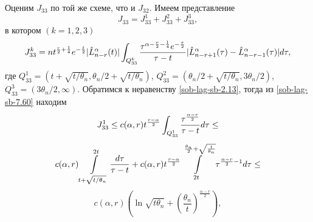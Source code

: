 Оценим $J_{33}$ по той же схеме, что и $J_{32}$. Имеем представление
\begin{equation}\label{sob-lag-sb-7.59}
J_{33}=J_{33}^1+J_{33}^2+J_{33}^3,
\end{equation}
в котором $(k=1,2,3)$
\begin{equation}\label{sob-lag-sb-7.60}
J_{33}^k=nt^{\frac{r}{2}+\frac14}e^{-\frac{t}{2}}|\hat L_{n-r}^\alpha(t)|\int_{Q_{{33}}^k}{\tau^{\alpha-\frac{r}{2}-\frac14}e^{-\frac{\tau}{2}}\over \tau-t}|\hat L_{n-r+1}^\alpha(\tau)-\hat L_{n-r-1}^\alpha(\tau)|d\tau,
\end{equation}
где $Q_{33}^1=(t+\sqrt{t/\theta_n},\theta_n/2+\sqrt{t/\theta_n})$, $Q_{33}^2=(\theta_n/2+\sqrt{t/\theta_n},3\theta_n/2)$, $Q_{33}^3=(3\theta_n/2,\infty)$. Обратимся  к неравенству \eqref{sob-lag-sb-2.13}, тогда из  \eqref{sob-lag-sb-7.60} находим
$$
J_{33}^1\le c(\alpha,r)t^{\frac{r-\alpha}{2}}\int_{Q_{33}^1}{\tau^{\frac{\alpha-r}{2}}\over \tau-t}d\tau\le
$$
$$
c(\alpha,r)\int\limits_{t+\sqrt{t/\theta_n}}^{2t}{d\tau\over \tau-t}+c(\alpha,r)t^{\frac{r-\alpha}{2}}\int\limits_{2t}^{\frac{\theta_n}{2}+\sqrt{\frac{t}{\theta_n}}}\tau^{\frac{\alpha-r}{2}-1}d\tau\le
$$
\begin{equation}\label{sob-lag-sb-7.61}
c(\alpha,r)\left(\ln\sqrt{t\theta_n}+\left(\frac{\theta_n}{t}\right)^\frac{\alpha-r}{2}\right),
\end{equation}

